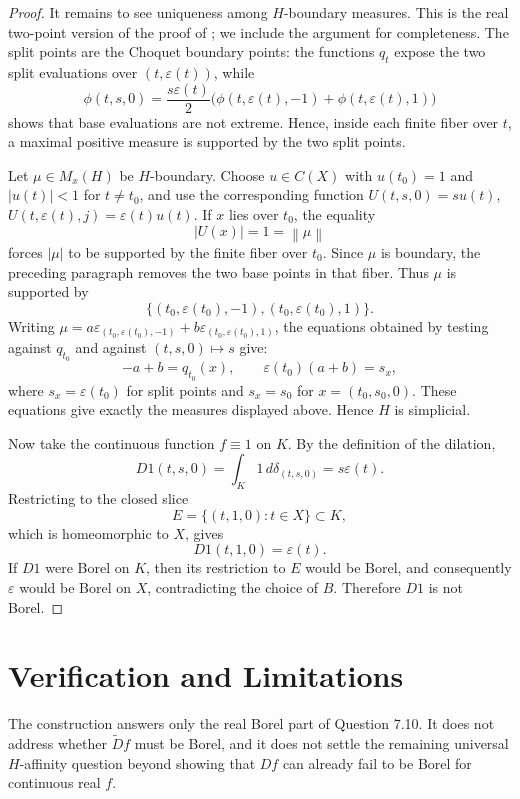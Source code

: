 \documentclass[11pt]{amsart}
\newcommand{\eps}{\varepsilon}
\newcommand{\norm}[1]{\left\lVert #1\right\rVert}
\begin{document}
\begin{proof}
It remains to see uniqueness among \(H\)-boundary measures.  This is the
real two-point version of the proof of \cite[Example 6.17, Step 5]{KS}; we
include the argument for completeness.  The split points are the Choquet
boundary points: the functions \(q_t\) expose the two split evaluations over
\((t,\eps(t))\), while
\[
  \phi(t,s,0)=\frac{s\eps(t)}{2}
      \bigl(\phi(t,\eps(t),-1)+\phi(t,\eps(t),1)\bigr)
\]
shows that base evaluations are not extreme.  Hence, inside each finite
fiber over \(t\), a maximal positive measure is supported by the two split
points.

Let \(\mu\in M_x(H)\) be \(H\)-boundary.  Choose \(u\in C(X)\) with
\(u(t_0)=1\) and \(|u(t)|<1\) for \(t\ne t_0\), and use the corresponding
function \(U(t,s,0)=s u(t)\), \(U(t,\eps(t),j)=\eps(t)u(t)\).  If
\(x\) lies over \(t_0\), the equality
\[
  |U(x)|=1=\norm{\mu}
\]
forces \(|\mu|\) to be supported by the finite fiber over \(t_0\).  Since
\(\mu\) is boundary, the preceding paragraph removes the two base points in
that fiber.  Thus \(\mu\) is supported by
\[
  \{(t_0,\eps(t_0),-1),(t_0,\eps(t_0),1)\}.
\]
Writing
\(\mu=a\varepsilon_{(t_0,\eps(t_0),-1)}
       +b\varepsilon_{(t_0,\eps(t_0),1)}\),
the equations obtained by testing against \(q_{t_0}\) and against
\((t,s,0)\mapsto s\) give:
\[
  -a+b=q_{t_0}(x), \qquad
  \eps(t_0)(a+b)=s_x,
\]
where \(s_x=\eps(t_0)\) for split points and \(s_x=s_0\) for
\(x=(t_0,s_0,0)\).  These equations give exactly the measures displayed
above.  Hence \(H\) is simplicial.

Now take the continuous function \(f\equiv1\) on \(K\).  By the definition of
the dilation,
\[
  D1(t,s,0)=\int_K 1\,d\delta_{(t,s,0)}=s\eps(t).
\]
Restricting to the closed slice
\[
  E=\{(t,1,0):t\in X\}\subset K,
\]
which is homeomorphic to \(X\), gives
\[
  D1(t,1,0)=\eps(t).
\]
If \(D1\) were Borel on \(K\), then its restriction to \(E\) would be Borel,
and consequently \(\eps\) would be Borel on \(X\), contradicting the choice
of \(B\).  Therefore \(D1\) is not Borel.
\end{proof}

\section{Verification and Limitations}

The construction answers only the real Borel part of Question 7.10.  It does
not address whether \(\widetilde D f\) must be Borel, and it does not settle
the remaining universal \(H\)-affinity question beyond showing that \(Df\)
can already fail to be Borel for continuous real \(f\).
\end{document}
